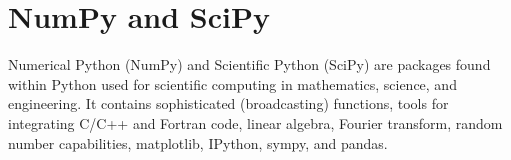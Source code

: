 \section*{NumPy and SciPy}
Numerical Python (NumPy) and Scientific Python (SciPy) are packages found
within Python used for scientific computing in mathematics, science, and
engineering. It contains sophisticated (broadcasting) functions,
tools for integrating C/C++ and Fortran code, linear algebra, 
Fourier transform, random number capabilities, matplotlib, IPython,
sympy, and pandas.

